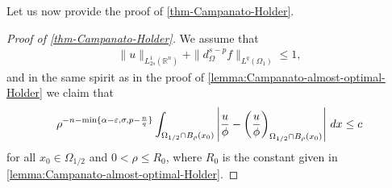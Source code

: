 \documentclass[11pt,reqno]{amsart}
\theoremstyle{plain}
\theoremstyle{definition}
\numberwithin{equation}{section}
\newcommand{\R}{\mathbb{R}}
\newcommand{\1}{\mathbbm{1}}
\renewcommand{\d}{\textnormal{\,d}}
\begin{document}
Let us now provide the proof of \autoref{thm-Campanato-Holder}.

\begin{proof}[Proof of \autoref{thm-Campanato-Holder}]
We assume that
\begin{align*}
\|u\|_{L^1_{2s}(\R^n)} + \|d_{\Omega}^{s-p} f\|_{L^q(\Omega_1)} \leq 1,
\end{align*}
and in the same spirit as in the proof of \autoref{lemma:Campanato-almost-optimal-Holder} we claim that
\begin{align}
\label{eq:suff-Campanato-optimal-Holder}
\rho^{-n-\min\{\alpha-\varepsilon,\sigma,p-\frac{n}{q}\}} \int_{\Omega_{1/2} \cap B_\rho(x_0)} \left| \frac{u}{\phi} - \left( \frac{u}{\phi} \right)_{\Omega_{1/2}\cap B_\rho(x_0)} \right| \d x \leq c
\end{align}
for all $x_0 \in \Omega_{1/2}$ and $0<\rho \leq R_0$, where $R_0$ is the constant given in \autoref{lemma:Campanato-almost-optimal-Holder}.


\end{proof}
\end{document}

